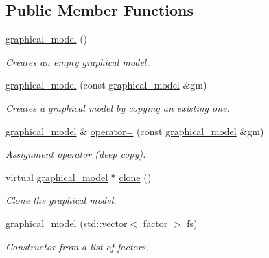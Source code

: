 \subsection*{Public Member Functions}
\begin{DoxyCompactItemize}
\item 
\hyperlink{classmerlin_1_1graphical__model_a5ee627101e4251833f1f6dd40cb34322}{graphical\+\_\+model} ()\hypertarget{classmerlin_1_1graphical__model_a5ee627101e4251833f1f6dd40cb34322}{}\label{classmerlin_1_1graphical__model_a5ee627101e4251833f1f6dd40cb34322}

\begin{DoxyCompactList}\small\item\em Creates an empty graphical model. \end{DoxyCompactList}\item 
\hyperlink{classmerlin_1_1graphical__model_aa35a615de634e3115f0ee3a5fcc7919e}{graphical\+\_\+model} (const \hyperlink{classmerlin_1_1graphical__model}{graphical\+\_\+model} \&gm)
\begin{DoxyCompactList}\small\item\em Creates a graphical model by copying an existing one. \end{DoxyCompactList}\item 
\hyperlink{classmerlin_1_1graphical__model}{graphical\+\_\+model} \& \hyperlink{classmerlin_1_1graphical__model_aa9b0f8a5d4e2098fce8e64f3778245e3}{operator=} (const \hyperlink{classmerlin_1_1graphical__model}{graphical\+\_\+model} \&gm)
\begin{DoxyCompactList}\small\item\em Assignment operator (deep copy). \end{DoxyCompactList}\item 
virtual \hyperlink{classmerlin_1_1graphical__model}{graphical\+\_\+model} $\ast$ \hyperlink{classmerlin_1_1graphical__model_a5315423e0cda62c03beda959b1311f48}{clone} ()
\begin{DoxyCompactList}\small\item\em Clone the graphical model. \end{DoxyCompactList}\item 
\hyperlink{classmerlin_1_1graphical__model_a322196c5146e7c660d5bf1c319fd691a}{graphical\+\_\+model} (std\+::vector$<$ \hyperlink{classmerlin_1_1factor}{factor} $>$ fs)
\begin{DoxyCompactList}\small\item\em Constructor from a list of factors. \end{DoxyCompactList}\item 

\end{DoxyCompactItemize}
